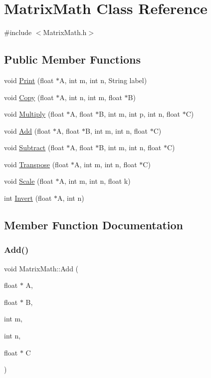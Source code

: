 \hypertarget{class_matrix_math}{}\section{Matrix\+Math Class Reference}
\label{class_matrix_math}


{\ttfamily \#include $<$Matrix\+Math.\+h$>$}

\subsection*{Public Member Functions}
\begin{DoxyCompactItemize}
\item 
void \hyperlink{class_matrix_math_a1ebe7b2f52b37c22ae933728951bcaa2}{Print} (float $\ast$A, int m, int n, String label)
\item 
void \hyperlink{class_matrix_math_a930d0115b62a5b90cea07fafea3143d4}{Copy} (float $\ast$A, int n, int m, float $\ast$B)
\item 
void \hyperlink{class_matrix_math_a70c07a8ea30698f5e824b1e759a0fa50}{Multiply} (float $\ast$A, float $\ast$B, int m, int p, int n, float $\ast$C)
\item 
void \hyperlink{class_matrix_math_a000bc14e0f353f501ba31dd2b5c3ac28}{Add} (float $\ast$A, float $\ast$B, int m, int n, float $\ast$C)
\item 
void \hyperlink{class_matrix_math_a3f6f124c09f5bb74e231c2c3f579ae4a}{Subtract} (float $\ast$A, float $\ast$B, int m, int n, float $\ast$C)
\item 
void \hyperlink{class_matrix_math_aba3cea366ead865747522c2fec0356f5}{Transpose} (float $\ast$A, int m, int n, float $\ast$C)
\item 
void \hyperlink{class_matrix_math_ada635d2211662e26c6efe867481505bb}{Scale} (float $\ast$A, int m, int n, float k)
\item 
int \hyperlink{class_matrix_math_ab9bf40bb3ecbab43d151030616ef70c0}{Invert} (float $\ast$A, int n)
\end{DoxyCompactItemize}


\subsection{Member Function Documentation}
\mbox{\label{class_matrix_math_a000bc14e0f353f501ba31dd2b5c3ac28}} 
\subsubsection{\texorpdfstring{Add()}{Add()}}
{\footnotesize\ttfamily void Matrix\+Math\+::\+Add (\begin{DoxyParamCaption}\item[{float $\ast$}]{A,  }\item[{float $\ast$}]{B,  }\item[{int}]{m,  }\item[{int}]{n,  }\item[{float $\ast$}]{C }\end{DoxyParamCaption})}

